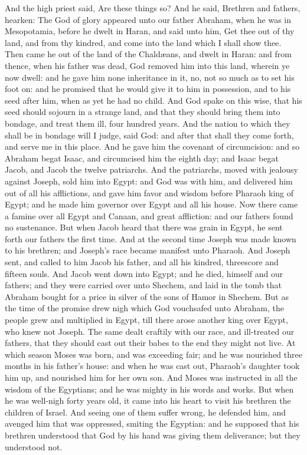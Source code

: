 And the high priest said, Are these things so? And he said, Brethren and fathers, hearken: The God of glory appeared unto our father Abraham, when he was in Mesopotamia, before he dwelt in Haran, and said unto him, Get thee out of thy land, and from thy kindred, and come into the land which I shall show thee. Then came he out of the land of the Chaldæans, and dwelt in Haran: and from thence, when his father was dead, God removed him into this land, wherein ye now dwell: and he gave him none inheritance in it, no, not so much as to set his foot on: and he promised that he would give it to him in possession, and to his seed after him, when as yet he had no child. And God spake on this wise, that his seed should sojourn in a strange land, and that they should bring them into bondage, and treat them ill, four hundred years. And the nation to which they shall be in bondage will I judge, said God: and after that shall they come forth, and serve me in this place. And he gave him the covenant of circumcision: and so Abraham begat Isaac, and circumcised him the eighth day; and Isaac begat Jacob, and Jacob the twelve patriarchs. And the patriarchs, moved with jealousy against Joseph, sold him into Egypt: and God was with him, and delivered him out of all his afflictions, and gave him favor and wisdom before Pharaoh king of Egypt; and he made him governor over Egypt and all his house. Now there came a famine over all Egypt and Canaan, and great affliction: and our fathers found no sustenance. But when Jacob heard that there was grain in Egypt, he sent forth our fathers the first time. And at the second time Joseph was made known to his brethren; and Joseph’s race became manifest unto Pharaoh. And Joseph sent, and called to him Jacob his father, and all his kindred, threescore and fifteen souls. And Jacob went down into Egypt; and he died, himself and our fathers; and they were carried over unto Shechem, and laid in the tomb that Abraham bought for a price in silver of the sons of Hamor in Shechem. But as the time of the promise drew nigh which God vouchsafed unto Abraham, the people grew and multiplied in Egypt, till there arose another king over Egypt, who knew not Joseph. The same dealt craftily with our race, and ill-treated our fathers, that they should cast out their babes to the end they might not live. At which season Moses was born, and was exceeding fair; and he was nourished three months in his father’s house: and when he was cast out, Pharaoh’s daughter took him up, and nourished him for her own son. And Moses was instructed in all the wisdom of the Egyptians; and he was mighty in his words and works. But when he was well-nigh forty years old, it came into his heart to visit his brethren the children of Israel. And seeing one of them suffer wrong, he defended him, and avenged him that was oppressed, smiting the Egyptian: and he supposed that his brethren understood that God by his hand was giving them deliverance; but they understood not. 